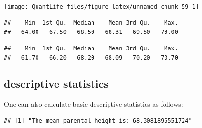 \documentclass[
]{book}
\newenvironment{Shaded}{\begin{snugshade}}{\end{snugshade}}
\newcommand{\KeywordTok}[1]{\textcolor[rgb]{0.13,0.29,0.53}{\textbf{#1}}}
\newcommand{\NormalTok}[1]{#1}
\newcommand{\OperatorTok}[1]{\textcolor[rgb]{0.81,0.36,0.00}{\textbf{#1}}}
\newcommand{\StringTok}[1]{\textcolor[rgb]{0.31,0.60,0.02}{#1}}
\theoremstyle{definition}
\theoremstyle{definition}
\theoremstyle{definition}
\theoremstyle{remark}
\begin{document}
\begin{center}\texttt{[image: QuantLife\_files/figure-latex/unnamed-chunk-59-1]} \end{center}

\begin{Shaded}
\end{Shaded}

\begin{verbatim}
##    Min. 1st Qu.  Median    Mean 3rd Qu.    Max. 
##   64.00   67.50   68.50   68.31   69.50   73.00
\end{verbatim}

\begin{Shaded}
\end{Shaded}

\begin{verbatim}
##    Min. 1st Qu.  Median    Mean 3rd Qu.    Max. 
##   61.70   66.20   68.20   68.09   70.20   73.70
\end{verbatim}

\hypertarget{descriptive-statistics}{%
\subsection{descriptive statistics}\label{descriptive-statistics}}

One can also calculate basic descriptive statistics as follows:

\begin{Shaded}
\end{Shaded}

\begin{verbatim}
## [1] "The mean parental height is: 68.3081896551724"
\end{verbatim}

\begin{Shaded}
\end{Shaded}
\end{document}
